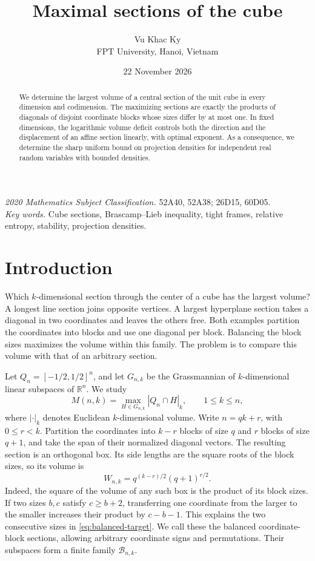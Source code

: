 \documentclass[11pt,a4paper]{article}
\theoremstyle{remark}\newtheorem{remark}[theorem]{Remark}
\numberwithin{equation}{section}
\begin{document}
\title{Maximal sections of the cube}
\author{Vu Khac Ky\\[3pt]\small FPT University, Hanoi, Vietnam}
\date{22 November 2026}
\maketitle
\begin{abstract}
We determine the largest volume of a central section of the unit cube
in every dimension and codimension. The maximizing sections are exactly
the products of diagonals of disjoint coordinate blocks whose sizes
differ by at most one. In fixed dimensions, the logarithmic volume
deficit controls both the direction and the displacement of an affine
section linearly, with optimal exponent. As a consequence, we determine
the sharp uniform bound on projection densities for independent real
random variables with bounded densities.

\end{abstract}
\noindent\textit{2020 Mathematics Subject Classification.}
52A40, 52A38; 26D15, 60D05.\\
\textit{Key words.} Cube sections, Brascamp--Lieb inequality, tight frames,
relative entropy, stability, projection densities.
\tableofcontents
\section{Introduction}
\label{sec:introduction}

Which \(k\)-dimensional section through the center of a cube has the
largest volume? A longest line section joins opposite vertices.
A largest hyperplane section takes a diagonal in two coordinates and
leaves the others free. Both examples partition the coordinates into
blocks and use one diagonal per block. Balancing the block sizes
maximizes the volume within this family. The problem is to compare
this volume with that of an arbitrary section.

Let $Q_n=[-1/2,1/2]^n$, and let $G_{n,k}$ be the Grassmannian of
$k$-dimensional linear subspaces of $\mathbb R^n$. We study
\[
 M(n,k)=\max_{H\in G_{n,k}}|Q_n\cap H|_k,\qquad 1\le k\le n,
\]
where $|\cdot|_k$ denotes Euclidean $k$-dimensional volume.
Write $n=qk+r$, with $0\le r<k$. Partition the coordinates into
$k-r$ blocks of size $q$ and $r$ blocks of size $q+1$, and take the
span of their normalized diagonal vectors. The resulting section is an
orthogonal box. Its side lengths are the square roots of the block sizes,
so its volume is
\begin{equation}\label{eq:balanced-target}
 W_{n,k}=q^{(k-r)/2}(q+1)^{r/2}.
\end{equation}
Indeed, the square of the volume of any such box is the product of
its block sizes. If two sizes \(b,c\) satisfy \(c\ge b+2\), transferring
one coordinate from the larger to the smaller increases their product
by \(c-b-1\). This explains the two consecutive sizes in
\eqref{eq:balanced-target}.
We call these the balanced coordinate-block sections, allowing arbitrary
coordinate signs and permutations. Their subspaces form a finite family
$\mathcal B_{n,k}$.
\end{document}
